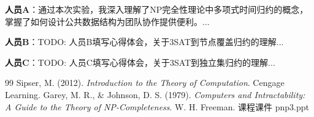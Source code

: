 \documentclass{sysucseexp}
\begin{document}
\textbf{人员A}：通过本次实验，我深入理解了NP完全性理论中多项式时间归约的概念，掌握了如何设计公共数据结构为团队协作提供便利。...

\textbf{人员B}：TODO: 人员B填写心得体会，关于3SAT到节点覆盖归约的理解...

\textbf{人员C}：TODO: 人员C填写心得体会，关于3SAT到独立集归约的理解...


\newpage

\begin{thebibliography}{99}
    Sipser, M. (2012). \textit{Introduction to the Theory of Computation}. Cengage Learning.
    Garey, M. R., \& Johnson, D. S. (1979). \textit{Computers and Intractability: A Guide to the Theory of NP-Completeness}. W. H. Freeman.
    课程课件 pnp3.ppt
\end{thebibliography}
\end{document}
